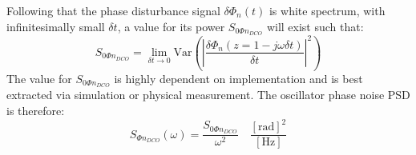 		Following that the phase disturbance signal $\delta\Phi_{n}(t)$ is white spectrum, with infinitesimally small $\delta t$, a value for its power $S_{0\Phi n_{DCO}}$ will exist such that:
		\begin{equation}
			S_{0\Phi n_{DCO}} = \lim_{\delta t\to0} \mathrm{Var}\left( \left|\frac{\delta\Phi_n(z=1-j\omega \delta t)}{\delta t}\right|^2 \right)
		\end{equation}
		The value for $S_{0\Phi n_{DCO}}$ is highly dependent on implementation and is best extracted via simulation or physical measurement. The oscillator phase noise PSD is therefore:
		\begin{equation}
			S_{\Phi n_{DCO}}(\omega)= \frac{S_{0\Phi n_{DCO}}}{\omega^2} \hspace{1em}\frac{[\text{rad}]^2}{[\text{Hz}]}
		\end{equation}
	
